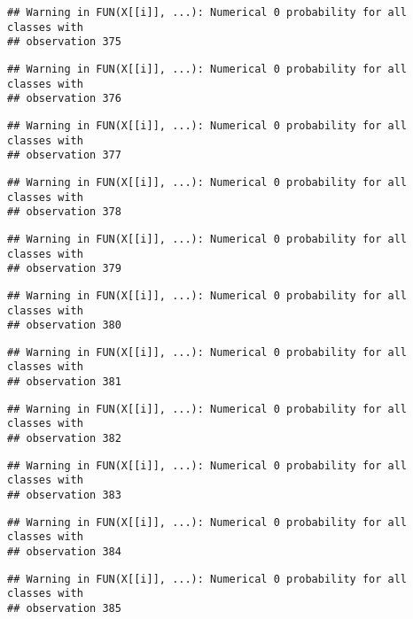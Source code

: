 \documentclass[
]{article}
\begin{document}
\begin{verbatim}
## Warning in FUN(X[[i]], ...): Numerical 0 probability for all classes with
## observation 375
\end{verbatim}

\begin{verbatim}
## Warning in FUN(X[[i]], ...): Numerical 0 probability for all classes with
## observation 376
\end{verbatim}

\begin{verbatim}
## Warning in FUN(X[[i]], ...): Numerical 0 probability for all classes with
## observation 377
\end{verbatim}

\begin{verbatim}
## Warning in FUN(X[[i]], ...): Numerical 0 probability for all classes with
## observation 378
\end{verbatim}

\begin{verbatim}
## Warning in FUN(X[[i]], ...): Numerical 0 probability for all classes with
## observation 379
\end{verbatim}

\begin{verbatim}
## Warning in FUN(X[[i]], ...): Numerical 0 probability for all classes with
## observation 380
\end{verbatim}

\begin{verbatim}
## Warning in FUN(X[[i]], ...): Numerical 0 probability for all classes with
## observation 381
\end{verbatim}

\begin{verbatim}
## Warning in FUN(X[[i]], ...): Numerical 0 probability for all classes with
## observation 382
\end{verbatim}

\begin{verbatim}
## Warning in FUN(X[[i]], ...): Numerical 0 probability for all classes with
## observation 383
\end{verbatim}

\begin{verbatim}
## Warning in FUN(X[[i]], ...): Numerical 0 probability for all classes with
## observation 384
\end{verbatim}

\begin{verbatim}
## Warning in FUN(X[[i]], ...): Numerical 0 probability for all classes with
## observation 385
\end{verbatim}
\end{document}
